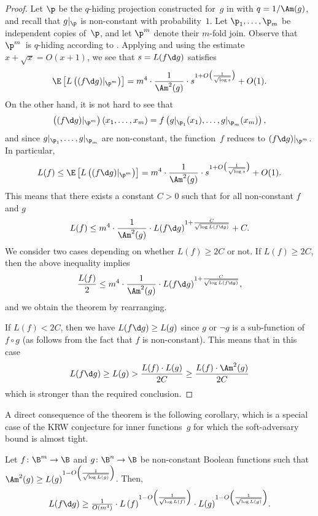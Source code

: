 \begin{proof}
Let $\p$ be the $q$-hiding projection constructed for~$g$ in 
with $q=1/\Am(g)$, and recall that $g|_{\p}$ is non-constant with
probability~$1$. Let $\p_{1},\ldots,\p_{m}$ be independent copies
of~$\p$, and let $\p^{m}$ denote their $m$-fold join. Observe
that $\p^{m}$~is $q$-hiding according to .
Applying  
and using the estimate
$x+\sqrt{x}=O(x+1)$, we see that $s=L(f\d g)$ satisfies 
\[
\E\left[L\left((f\d g)|_{\p^{m}}\right)\right]=m^{4}\cdot\frac{1}{\Am^{2}(g)}\cdot s^{1+O\bigl(\frac{1}{\sqrt{\log s}}\bigr)}+O(1).
\]
On the other hand, it is not hard to see that 
\[
\left((f\d g)|_{\p^{m}}\right)(x_{1},\ldots,x_{m})=f\left(g|_{\p_{1}}(x_{1}),\ldots,g|_{\p_{m}}(x_{m})\right),
\]
and since $g|_{\p_{1}},\ldots,g|_{\p_{m}}$ are non-constant, the
function~$f$ reduces to $(f\d g)|_{\p^{m}}$. In particular, 
\[
L(f)\le\E\left[L\left((f\d g)|_{\p^{m}}\right)\right]=m^{4}\cdot\frac{1}{\Am^{2}(g)}\cdot s^{1+O\bigl(\frac{1}{\sqrt{\log s}}\bigr)}+O(1).
\]
This means that there exists a constant $C>0$ such that for all non-constant $f$ and $g$
\[
L(f)\le m^{4}\cdot\frac{1}{\Am^{2}(g)}\cdot L(f\d g)^{1+\frac{C}{\sqrt{\log L(f\d g)}}}+C.\]
We consider two cases depending on whether $L(f)\ge 2C$ or not. 
If $L(f) \ge 2C$, then the above inequality implies
\[\frac{L(f)}{2}\le m^{4}\cdot\frac{1}{\Am^{2}(g)}\cdot L(f\d g)^{1+\frac{C}{\sqrt{\log L(f\d g)}}},\]
 and we obtain the theorem by rearranging. 

If $L(f) < 2C$, then we have $L(f\d g) \ge L(g)$ since $g$ or $\neg g$ is a sub-function of $f\circ g$ (as follows from the fact that $f$ is non-constant).
This means that in this case 
\[L(f\d g) \ge L(g) > \frac{L(f) \cdot L(g)}{2C} \ge \frac{L(f) \cdot \Am^2(g)}{2C}
\]
which is stronger than the required conclusion.
\end{proof}
A direct consequence of the theorem is the following corollary, which
is a special case of the KRW conjecture for inner functions~$g$
for which the soft-adversary bound is almost tight. 
\begin{corollary}
\label{cor:KRW-special-case}Let $f\colon\B^{m}\to\B$ and $g\colon\B^{n}\to\B$
be non-constant Boolean functions such that $\Am^{2}(g)\ge L(g)^{1-O\left(\frac{1}{\sqrt{\log L(g)}}\right)}$.
Then, 
\[
L(f\d g)\ge\tfrac{1}{O(m^{4})}\cdot L\left(f\right)^{1-O\left(\frac{1}{\sqrt{\log L(f)}}\right)}\cdot L(g)^{1-O\left(\frac{1}{\sqrt{\log L(g)}}\right)}.
\]
\end{corollary}
%
%

